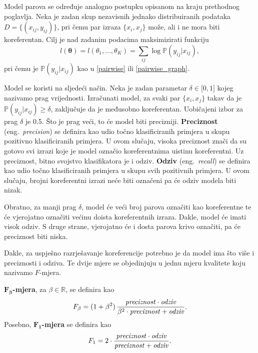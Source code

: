 \documentclass[a4paper,twoside,12pt]{memoir} %
\newcommand{\ti}[1]{\textit{#1\/}}
\newcommand{\tb}{\textbf}
\begin{document}
	\bigskip

	Model parova se određuje analogno postupku opisanom na kraju prethodnog poglavlja. Neka je zadan skup nezavisnih jednako distribuiranih podataka $D = \{(x_{ij}, y_{ij})\}$, pri čemu par izraza $\{x_i, x_j\}$ može, ali i ne mora biti koreferentan. Cilj je nad zadanim podacima maksimizirati funkciju
	\begin{equation*}
	l(\bm{\theta}) = l(\theta_1, \ldots, \theta_K) = \sum_{ij} \log \mathbb{P}(y_{ij} | x_{ij}),
	\end{equation*}
	pri čemu je $\mathbb{P}(y_{ij} | x_{ij})$ kao u \eqref{pairwise} ili \eqref{pairwise_graph}.

	\bigskip

	Model se koristi na sljedeći način. Neka je zadan parametar $\delta \in \lbrack 0, 1\rbrack$ kojeg nazivamo prag vrijednosti. Izračunati model, za svaki par $\{x_i, x_j\}$ takav da je $\mathbb{P} (y_{ij} | x_{ij}) \geq \delta$, zaključuje da je međusobno koreferentan. Uobičajeni izbor za prag $\delta$ je 0.5. Što je prag veći, to će model biti precizniji. \tb{Preciznost} (eng.~\ti{precision}) se definira kao udio točno klasificiranih primjera u skupu pozitivno klasificiranih primjera. U ovom slučaju, visoka preciznost znači da su gotovo svi izrazi koje je model označio koreferentnima uistinu koreferentni. Uz preciznost, bitno svojstvo klasifikatora je i odziv. \tb{Odziv} (eng.~\ti{recall}) se definira kao udio točno klasificiranih primjera u skupu svih pozitivnih primjera. U ovom slučaju, brojni koreferentni izrazi neće biti označeni pa će odziv modela biti nizak.

	Obratno, za manji prag $\delta$, model će veći broj parova označiti kao koreferentne te će vjerojatno označiti većinu doista koreferentnih izraza. Dakle, model će imati visok odziv. S druge strane, vjerojatno će i dosta parova krivo označiti, pa će preciznost biti niska.

	Dakle, za uspješno razrješavanje koreferencije potrebno je da model ima što više i preciznosti i odziva. Te dvije mjere se objedinjuju u jednu mjeru kvalitete koju nazivamo $F$-mjera.

	\begin{defn}
		$\bm{F_\beta}$\tb{-mjera}, za $\beta \in \mathbb{R}$, se definira kao
		\begin{equation*}
		F_\beta = (1+\beta^2) \, \frac
		{\ti{preciznost} \cdot \ti{odziv}}
		{\beta^2 \cdot \ti{preciznost} + \ti{odziv}}.
		\end{equation*}
		Posebno, $\bm{F_1}$\tb{-mjera} se definira kao
		\begin{equation*}
		F_1 = 2 \cdot \frac
		{\ti{preciznost} \cdot \ti{odziv}}
		{\ti{preciznost} + \ti{odziv}}.
		\end{equation*}
	\end{defn}
\end{document}
